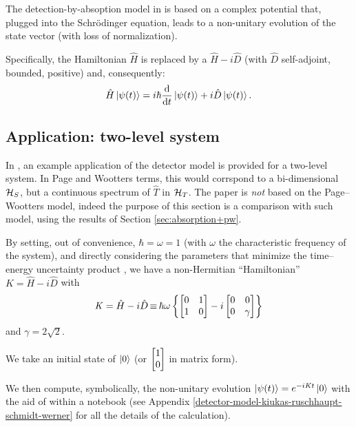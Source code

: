 The detection-by-absoption model in \cite{RuschhauptAbsorption}
is based on a complex potential that, plugged into the Schr\"odinger equation,
leads to a non-unitary evolution of the state vector
(with loss of normalization).

Specifically, the Hamiltonian $\hat{H}$ is replaced by a $\hat{H} - i\hat{D}$
(with $\hat{D}$ self-adjoint, bounded, positive)
and, consequently:
\begin{equation}\label{eq:schrod_complex_pot}
  \hat{H} \ket{\psi(t)} = i\hbar\dv{t}\ket{\psi(t)} +i\hat{D}\ket{\psi(t)} \text{.}
\end{equation}

\citereset\subsection{Application: two-level system}

In \cite{RuschhauptAbsorption}, an example application of the detector model
is provided for a two-level system.
In Page and Wootters terms,
this would corrspond to a bi-dimensional $\mathcal{H}_S$, but a continuous
spectrum of $\hat{T}$ in $\mathcal{H}_T$. The paper is \emph{not} based on
the Page--Wootters model, indeed the purpose of this section is a comparison
with such model, using the results of Section \ref{sec:absorption+pw}.

By setting, out of convenience, $\hbar = \omega = 1$
(with $\omega$ the characteristic frequency of the system),
and directly considering the parameters
that minimize the time--energy uncertainty product \parencite{RuschhauptAbsorption},
we have a non-Hermitian ``Hamiltonian''
$\mathit{K} = \hat{H} - i\hat{D}$ with
\begin{equation}\label{eq:complexpot}
  \mathit{K} = \hat{H} - i\hat{D} \operatorname*{\equiv}
    \hbar\omega\left\{
      \left[\begin{matrix}0 & 1\\1 & 0\end{matrix}\right] -
      i \left[\begin{matrix}0 & 0\\0 & \gamma \end{matrix}\right]
    \right\}
\end{equation}
and $\gamma = 2\sqrt{2}$.

We take an initial state of $\ket{0}$
(or $\mqty[1\\0]$ in matrix form).

We then compute, symbolically, the non-unitary evolution
$\ket{\psi(t)} = e^{-i\mathit{K}t}\ket{0}$
with the aid of  \parencite{comp:sympy} within a  \parencite{comp:jupyter} notebook
(see Appendix \ref{detector-model-kiukas-ruschhaupt-schmidt-werner} for all the details of the calculation).

